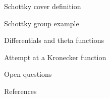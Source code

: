 \documentclass[11pt,aspectratio=169]{beamer}
\begin{document}
\begin{frame}{Schottky cover definition}

\end{frame}

\begin{frame}{Schottky group example}

\end{frame}

\begin{frame}{Differentials and theta functions}

\end{frame}

\begin{frame}{Attempt at a Kronecker function}{\tiny \cite{Cha22}}

\end{frame}

\begin{frame}{Open questions}

\end{frame}

\begin{frame}{References}
    \printbibliography{}
\end{frame}
\end{document}
